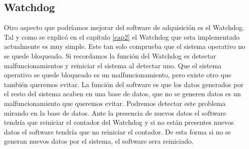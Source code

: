 	\subsection{Watchdog}
	Otro aspecto que podríamos mejorar del software de adquisición es el Watchdog. Tal y como se explicó en el capítulo \ref{cap2} el Watchdog que esta
	implementado actualmente es muy simple. Este tan solo comprueba que el sistema operativo no se quede bloqueado. Si recordamos la función del
	Watchdog es detectar malfuncionamientos y reiniciar el sistema al detectar uno. Que el sistema operativo se quede bloqueado es un
	malfuncionamiento, pero existe otro que también queremos evitar. La función del software es que los datos generados por el resto del sistema
	acaben en una base de datos, que no se generen datos es un malfuncionamiento que queremos evitar. Podremos detectar este problema mirando en
	la base de datos. Ante la presencia de nuevos datos el software tendría que reiniciar el contador del Watchdog y si no están presentes nuevos
	datos el software tendría que no reiniciar el contador. De esta forma si no se generan nuevos datos por el sistema, el software sera
	reiniciado. 

